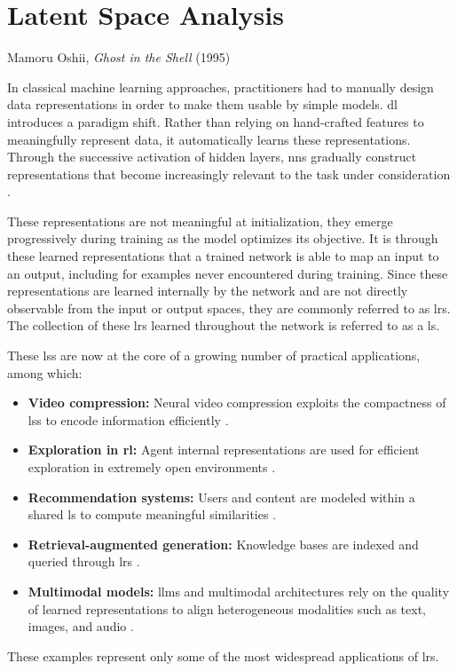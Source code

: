 \chapter{Latent Space Analysis}
\label{chap:latent_space_analysis}

{Mamoru Oshii, \textit{Ghost in the Shell} (1995)~\parencite{oshii1995ghost}}

\chaptercontents

\glsresetall

In classical machine learning approaches, practitioners had to manually design data representations in order to make them usable by simple models.
\gls{dl} introduces a paradigm shift.
Rather than relying on hand-crafted features to meaningfully represent data, it automatically learns these representations.
Through the successive activation of hidden layers, \glspl{nn} gradually construct representations that become increasingly relevant to the task under consideration \parencite{rumelhart1986learning}.

These representations are not meaningful at initialization, they emerge progressively during training as the model optimizes its objective.
It is through these learned representations that a trained network is able to map an input to an output, including for examples never encountered during training.
Since these representations are learned internally by the network and are not directly observable from the input or output spaces, they are commonly referred to as \glspl{lr}.
The collection of these \glspl{lr} learned throughout the network is referred to as a \gls{ls}.

These \glspl{ls} are now at the core of a growing number of practical applications, among which:
\begin{itemize}
    \item \textbf{Video compression:} Neural video compression exploits the compactness of \glspl{ls} to encode information efficiently \parencite{lu2019dvcendtoenddeepvideo}.
    \item \textbf{Exploration in \gls{rl}:} Agent internal representations are used for efficient exploration in extremely open environments \parencite{burda2018largescalestudycuriositydrivenlearning}.
    \item \textbf{Recommendation systems:} Users and content are modeled within a shared \gls{ls} to compute meaningful similarities \parencite{he2017neuralcollaborativefiltering}.
    \item \textbf{Retrieval-augmented generation:} Knowledge bases are indexed and queried through \glspl{lr} \parencite{lewis2021retrievalaugmentedgenerationknowledgeintensivenlp}.
    \item \textbf{Multimodal models:} \Glspl{llm} and multimodal architectures rely on the quality of learned representations to align heterogeneous modalities such as text, images, and audio \parencite{radford2021learningtransferablevisualmodels}.
\end{itemize}
These examples represent only some of the most widespread applications of \glspl{lr}.

